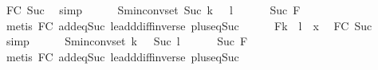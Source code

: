 \begin{isabellebody}
\ FC{}\ Suc\ \isamarkupfalse%
\ simp\isanewline
\ \ \ \ \isamarkupfalse%
\ S{}{\isacharcolon}{\kern0pt}{\isachardoublequoteopen}min{\isacharunderscore}{\kern0pt}conv{\isacharunderscore}{\kern0pt}set\ {\isacharparenleft}{\kern0pt}Suc\ {\isacharparenleft}{\kern0pt}k\ {\isacharplus}{\kern0pt}\ {}{\isacharparenright}{\kern0pt}{\isacharparenright}{\kern0pt}\ {\isacharparenleft}{\kern0pt}l\ {\isacharplus}{\kern0pt}\ {}{\isacharparenright}{\kern0pt}\ {\isasymnoteq}\ {\isacharbraceleft}{\kern0pt}{\isacharbraceright}{\kern0pt}{\isachardoublequoteclose}\ \isamarkupfalse%
\ Suc\ F{}\isanewline
\ \ \ \ \ \ \isamarkupfalse%
\ {\isacharparenleft}{\kern0pt}metis\ FC{}{\isacharparenleft}{\kern0pt}{}{\isacharparenright}{\kern0pt}\ add{\isacharunderscore}{\kern0pt}{}{\isacharunderscore}{\kern0pt}eq{\isacharunderscore}{\kern0pt}Suc{\isacharprime}{\kern0pt}\ le{\isacharunderscore}{\kern0pt}add{\isacharunderscore}{\kern0pt}diff{\isacharunderscore}{\kern0pt}inverse\ plus{\isacharunderscore}{\kern0pt}{}{\isacharunderscore}{\kern0pt}eq{\isacharunderscore}{\kern0pt}Suc{\isacharparenright}{\kern0pt}\isanewline
\ \ \ \ \isamarkupfalse%
\ F{}{\isacharcolon}{\kern0pt}{\isachardoublequoteopen}{\isacharparenleft}{\kern0pt}k{\isacharminus}{\kern0pt}{}{\isacharparenright}{\kern0pt}\ {\isacharplus}{\kern0pt}\ l\ {\isacharequal}{\kern0pt}\ x{\isachardoublequoteclose}\ \isamarkupfalse%
\ FC{}\ Suc\ \isamarkupfalse%
\ simp\isanewline
\ \ \ \ \isamarkupfalse%
\ S{}{\isacharcolon}{\kern0pt}{\isachardoublequoteopen}min{\isacharunderscore}{\kern0pt}conv{\isacharunderscore}{\kern0pt}set\ {\isacharparenleft}{\kern0pt}k\ {\isacharplus}{\kern0pt}\ {}{\isacharparenright}{\kern0pt}\ {\isacharparenleft}{\kern0pt}Suc\ {\isacharparenleft}{\kern0pt}l\ {\isacharplus}{\kern0pt}\ {}{\isacharparenright}{\kern0pt}{\isacharparenright}{\kern0pt}\ {\isasymnoteq}\ {\isacharbraceleft}{\kern0pt}{\isacharbraceright}{\kern0pt}{\isachardoublequoteclose}\ \isamarkupfalse%
\ Suc\ F{}\isanewline
\ \ \ \ \ \ \isamarkupfalse%
\ {\isacharparenleft}{\kern0pt}metis\ FC{}{\isacharparenleft}{\kern0pt}{}{\isacharparenright}{\kern0pt}\ add{\isacharunderscore}{\kern0pt}{}{\isacharunderscore}{\kern0pt}eq{\isacharunderscore}{\kern0pt}Suc{\isacharprime}{\kern0pt}\ le{\isacharunderscore}{\kern0pt}add{\isacharunderscore}{\kern0pt}diff{\isacharunderscore}{\kern0pt}inverse\ plus{\isacharunderscore}{\kern0pt}{}{\isacharunderscore}{\kern0pt}eq{\isacharunderscore}{\kern0pt}Suc{\isacharparenright}{\kern0pt}\isanewline

\end{isabellebody}
